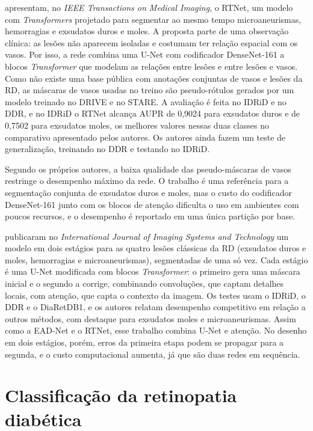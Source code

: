  apresentam, no \textit{IEEE Transactions on Medical Imaging}, o RTNet, um modelo com \textit{Transformers} projetado para segmentar ao mesmo tempo microaneurismas, hemorragias e exsudatos duros e moles. A proposta parte de uma observação clínica: as lesões não aparecem isoladas e costumam ter relação espacial com os vasos. Por isso, a rede combina uma U-Net com codificador DenseNet-161 a blocos \textit{Transformer} que modelam as relações entre lesões e entre lesões e vasos. Como não existe uma base pública com anotações conjuntas de vasos e lesões da RD, as máscaras de vasos usadas no treino são pseudo-rótulos gerados por um modelo treinado no DRIVE e no STARE. A avaliação é feita no IDRiD e no DDR, e no IDRiD o RTNet alcança AUPR de 0,9024 para exsudatos duros e de 0,7502 para exsudatos moles, os melhores valores nessas duas classes no comparativo apresentado pelos autores. Os autores ainda fazem um teste de generalização, treinando no DDR e testando no IDRiD.

Segundo os próprios autores, a baixa qualidade das pseudo-máscaras de vasos restringe o desempenho máximo da rede. O trabalho é uma referência para a segmentação conjunta de exsudatos duros e moles, mas o custo do codificador DenseNet-161 junto com os blocos de atenção dificulta o uso em ambientes com poucos recursos, e o desempenho é reportado em uma única partição por base.

 publicaram no \textit{International Journal of Imaging Systems and Technology} um modelo em dois estágios para as quatro lesões clássicas da RD (exsudatos duros e moles, hemorragias e microaneurismas), segmentadas de uma só vez. Cada estágio é uma U-Net modificada com blocos \textit{Transformer}: o primeiro gera uma máscara inicial e o segundo a corrige, combinando convoluções, que captam detalhes locais, com atenção, que capta o contexto da imagem. Os testes usam o IDRiD, o DDR e o DiaRetDB1, e os autores relatam desempenho competitivo em relação a outros métodos, com destaque para exsudatos moles e microaneurismas. Assim como a EAD-Net e o RTNet, esse trabalho combina U-Net e atenção. No desenho em dois estágios, porém, erros da primeira etapa podem se propagar para a segunda, e o custo computacional aumenta, já que são duas redes em sequência.

\section{Classificação da retinopatia diabética}
\label{sec:rel-classificacao}

